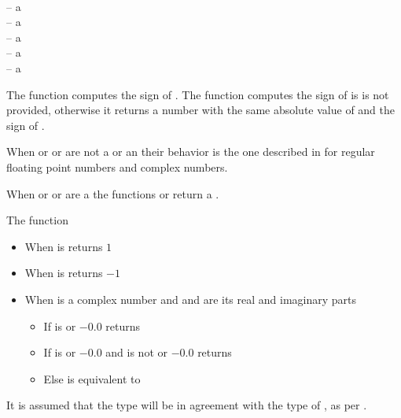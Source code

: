 \documentclass[../Comparisons-Predicates.tex]{subfiles}
\begin{document}


\DSyntax{}

  \RArrow {}\\
   
\RArrow {}


\DArgsNValues{}

 -- a \\
 -- a \\
 -- a \\
 -- a \\
 -- a 


\DDescription{}

The function  computes the sign of . The function
 computes the sign of  is  is not
provided, otherwise it returns a number with the same absolute value of
 and the sign of .

\noindent
When  or  or  are not a
 or an
 their behavior is the one described in
\cite{1996:ANSIHyperSpec} for regular floating point numbers and complex
numbers.

\noindent
When  or  or  are a  the functions  or  return a
.

\noindent
The function 
\begin{itemize}
\item When  is  returns $1$
\item When  is  returns $-1$
\item When  is a complex number and  and
   are its real and imaginary parts
  \begin{itemize}
  \item If  is  or
    $-0.0$ returns\\
     \code{))))}
  \item If  is  or
    $-0.0$ and  is not  or
    $-0.0$ returns\\
     \code{))))}
  \item Else is equivalent to\\
   
  \code{))))}
  \end{itemize}
\end{itemize}
It is assumed that the  type will be in
agreement with the type of , as per
\cite{1996:ANSIHyperSpec}.
\end{document}
